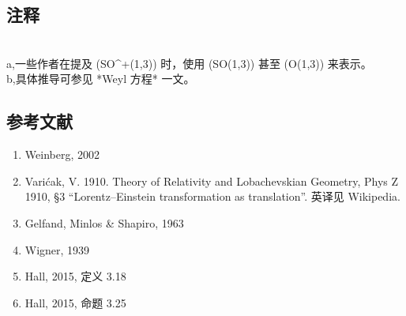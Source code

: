 \subsection{注释}\\
a,一些作者在提及 (SO^{+}(1,3)) 时，使用 (SO(1,3)) 甚至 (O(1,3)) 来表示。\\
b,具体推导可参见 *Weyl 方程* 一文。
\subsection{参考文献}
\begin{enumerate}
\item Weinberg, 2002
\item Varićak, V. 1910. Theory of Relativity and Lobachevskian Geometry, Phys Z 1910, §3 “Lorentz–Einstein transformation as translation”. 英译见 Wikipedia.
\item Gelfand, Minlos & Shapiro, 1963
\item  Wigner, 1939
\item Hall, 2015, 定义 3.18
\item Hall, 2015, 命题 3.25
\end{enumerate}
